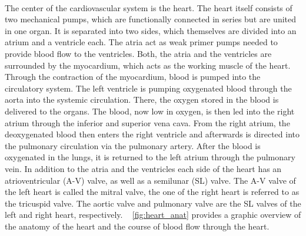  \\The center of the cardiovascular system is the heart. The heart itself consists of two mechanical pumps, which are functionally connected in series but are united in one organ. It is separated into two sides, which themselves are divided into an atrium and a ventricle each. The atria act as weak primer pumps needed to provide blood flow to the ventricles.\cite{HKS4} Both, the atria and the ventricles are surrounded by the myocardium, which acts as the working muscle of the heart. Through the contraction of the myocardium, blood is pumped into the circulatory system.\cite{HKS7} The left ventricle is pumping oxygenated blood through the aorta into the systemic circulation. There, the oxygen stored in the blood is delivered to the organs. The blood, now low in oxygen, is then led into the right atrium through the inferior and superior vena cava. From the right atrium, the deoxygenated blood then enters the right ventricle and afterwards is directed into the pulmonary circulation via the pulmonary artery. After the blood is oxygenated in the lungs, it is returned to the left atrium through the pulmonary vein.\cite{HKS4} In addition to the atria and the ventricles each side of the heart has an atrioventricular (A-V) valve, as well as a semilunar (SL) valve. The A-V valve of the left heart is called the mitral valve, the one of the right heart is referred to as the tricuspid valve. The aortic valve and pulmonary valve are the SL valves of the left and right heart, respectively.\cite{HKS7} \figurename~ \ref{fig:heart_anat} provides a graphic overview of the anatomy of the heart and the course of blood flow through the heart.

